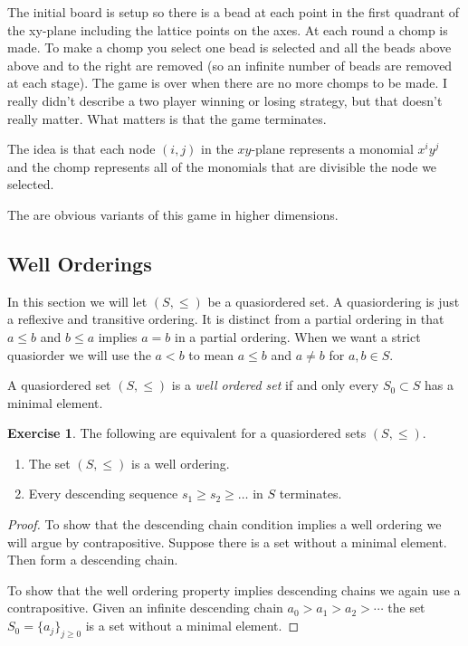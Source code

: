 \documentclass[12pt]{book}
\numberwithin{equation}{section}
\theoremstyle{definition}
\newtheorem{exercise}[theorem]{Exercise}
\theoremstyle{remark}
\begin{document}
The initial board is setup so there is a bead at each point in the first quadrant of the xy-plane including the lattice points on the axes. 
At each round a chomp is made. 
To make a chomp you select one bead is selected and all the beads above above and to the right are removed (so an infinite number of beads are removed at each stage). 
The game is over when there are no more chomps to be made.
I really didn't describe a two player winning or losing strategy, but that doesn't really matter. 
What matters is that the game terminates. 

The idea is that each node $(i,j)$ in the $xy$-plane represents a monomial $x^iy^j$ and the chomp represents all of the monomials that are divisible the node we selected. 

The are obvious variants of this game in higher dimensions.

\subsection{Well Orderings}
In this section we will let $(S,\leq)$ be a quasiordered set.
A quasiordering is just a reflexive and transitive ordering. 
It is distinct from a partial ordering in that $a\leq b$ and $b\leq a$ implies $a=b$ in a partial ordering. 
When we want a strict quasiorder we will use the $a<b$ to mean $a\leq b$ and $a\neq b$ for $a,b\in S$. 

A quasiordered set $(S,\leq)$ is a \emph{well ordered set} if and only every $S_0 \subset S$ has a minimal element. 
\begin{exercise}
	The following are equivalent for a quasiordered sets $(S,\leq)$.
	\begin{enumerate}[topsep=0pt]
	\item \label{I:well-order} The set $(S,\leq)$ is a well ordering.
	\item \label{I:dcc} Every descending sequence $s_1\geq s_2 \geq \ldots$ in $S$ terminates. 
	\end{enumerate}
\end{exercise}
\begin{proof}
	To show that the descending chain condition implies a well ordering we will argue by contrapositive. 
	Suppose there is a set without a minimal element. 
	Then form a descending chain. 
	
	To show that the well ordering property implies descending chains we again use a contrapositive. 
	Given an infinite descending chain $a_0>a_1>a_2 >\cdots$ the set $S_0 = \lbrace a_j \rbrace_{j \geq 0}$ is a set without a minimal element. 
\end{proof}
\end{document}
